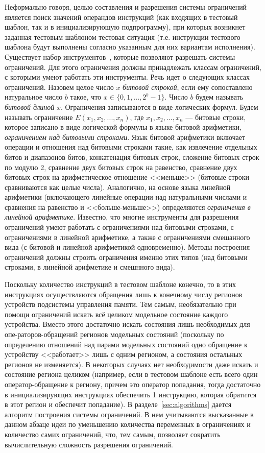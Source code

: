 Неформально говоря, целью составления и разрешения системы ограничений является поиск значений операндов инструкций (как входящих в тестовый шаблон, так и в инициализирующую подпрограмму), при которых возникнет заданная тестовым шаблоном тестовая ситуация (т.е. инструкции тестового шаблона будут выполнены согласно указанным для них вариантам исполнения). Существует набор инструментов~\cite{Z3, Yices}, которые позволяют разрешать системы ограничений. Для этого ограничения должны принадлежать классам ограничений, с которыми умеют работать эти инструменты. Речь идет о следующих классах ограничений. Назовем целое число $x$ \emph{битовой строкой}, если ему сопоставлено натуральное число $b$ такое, что $x \in \{0, 1, ..., 2^b{-}1\}$. Число $b$ будем называть \emph{битовой длиной} $x$. Ограничения записываются в виде логических формул. Будем называть ограничение $E(x_1, x_2, ..., x_n)$, где $x_1, x_2, ..., x_n$ --- битовые строки, которое записано в виде логической формулы в языке битовой арифметики, \emph{ограничением над битовыми строками}. Язык битовой арифметики включает операции и отношения над битовыми строками такие, как извлечение отдельных битов и диапазонов битов, конкатенация битовых строк, сложение битовых строк по модулю 2, сравнение двух битовых строк на равенство, сравнение двух битовых строк на арифметическое отношение <<меньше>> (битовые строки сравниваются как целые числа). Аналогично, на основе языка линейной арифметики (включающего линейные операции над натуральными числами и сравнения на равенство и <<больше-меньше>>) определяются \emph{ограничения в линейной арифметике}. Известно, что многие инструменты для разрешения ограничений умеют работать с ограничениями над битовыми строками, с ограничениями в линейной арифметике, а также с ограничениями смешанного вида (с битовой и линейной арифметикой одновременно). Методы построения ограничений должны строить ограничения именно этих типов (над битовыми строками, в линейной арифметике и смешнного вида).

Поскольку количество инструкций в тестовом шаблоне конечно, то в этих инструкциях осуществляются обращения лишь к конечному числу регионов устройств подсистемы управления памяти. Тем самым, необязательно при помощи ограничений искать всё целиком модельное состояние каждого устройства. Вместо этого достаточно искать состояния лишь необходимых для опе-раторов-обращений регионов модельных состояний (поскольку по определению отношений над парами модельных состояний одно обращение к устройству <<работает>> лишь с одним регионом, а состояния остальных регионов не изменяется). В некоторых случаях нет необходимости даже искать и состояние региона целиком (например, если в тестовом шаблоне есть всего один оператор-обращение к региону, причем это оператор попадания, тогда достаточно в инициализирующих инструкциях обеспечить 1 инструкцию, которая обратится в этот регион и обеспечит попадание). В разделе~\ref{sec:algorithms} дается алгоритм построения системы ограничений. В нем учитываются высказанные в данном абзаце идеи по уменьшению количества переменных в ограничениях и количество самих ограничений, что, тем самым, позволяет сократить вычислительную сложность разрешения ограничений.

